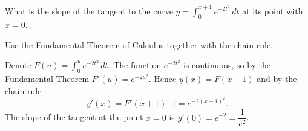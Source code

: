 
\begin{question}
What is the slope of the tangent to the curve $y=\int_0^{x+1}e^{-2t^2}\,dt$ at its point with $x=0$.
\end{question}

\begin{hint}
Use the Fundamental Theorem of Calculus together with the chain rule.
\end{hint}

\begin{solution}
Denote $F(u)=\int_0^u e^{-2t^2}\,dt$. The function $e^{-2t^2}$ is continuous, so by the Fundamental Theorem $F'(u)=e^{-2u^2}$. Hence $y(x)=F(x+1)$ and by the chain rule
\[ y'(x)=F'(x+1)\cdot 1=e^{-2(x+1)^2}. \]
The slope of the tangent at the point $x=0$ is $y'(0)=e^{-2}=\dfrac{1}{e^2}$.
\end{solution}
